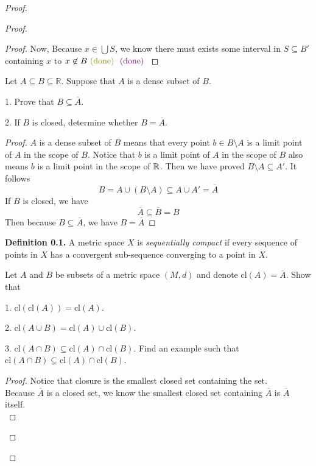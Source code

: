 \documentclass{report}
\begin{document}
\begin{proof}
\begin{proof}
\begin{proof}
Now, Because $x\in \bigcup S$, we know there must exists some interval in $S\subseteq B'$ containing  $x$  \CaC to $x\not\in B\odone\vdone$
\end{proof}
\begin{question}{}{}
Let \( A \subseteq B \subseteq \mathbb{R} \). Suppose that \( A \) is a dense subset of \( B \).

1. Prove that \( B \subseteq \overline{A} \).

2. If \( B \) is closed, determine whether \( B = \overline{A} \).
\end{question}
\begin{proof}
$A$ is a dense subset of $B$ means that every point $b\in B\setminus A$ is a limit point of $A$ in the scope of $B$. Notice that $b$ is a limit point of  $A$ in the scope of $B$ also means $b$ is a limit point in the scope of $\mathbb{R}$. Then we have proved $B\setminus A\subseteq A'$. It follows
\begin{equation}
B=A \cup (B\setminus A)\subseteq A\cup A'=\overline{A}
\end{equation}
If $B$ is closed, we have
 \begin{equation}
\overline{A}\subseteq \overline{B}=B
\end{equation}
Then because $B\subseteq \overline{A}$, we have $B=\overline{A}$



\end{proof}
\textbf{Definition 0.1.} A metric space \( X \) is \textit{sequentially compact} if every sequence of points in \( X \) has a convergent sub-sequence converging to a point in \( X \).
\begin{question}{}{}

Let \( A \) and \( B \) be subsets of a metric space \( (M, d) \) and denote \( \text{cl}(A) = \overline{A} \). Show that

1. \( \text{cl}(\text{cl}(A)) = \text{cl}(A) \).

2. \( \text{cl}(A \cup B) = \text{cl}(A) \cup \text{cl}(B) \).

3. \( \text{cl}(A \cap B) \subseteq \text{cl}(A) \cap \text{cl}(B) \). Find an example such that \( \text{cl}(A \cap B) \subsetneq \text{cl}(A) \cap \text{cl}(B) \).
\end{question}
\begin{proof}
Notice that closure is the smallest closed set containing the set.\\

Because $\overline{A}$ is a closed set, we know the smallest closed set containing $\overline{A}$ is $\overline{A}$ itself.\\


\end{proof}
\end{proof}
\end{proof}
\end{document}
